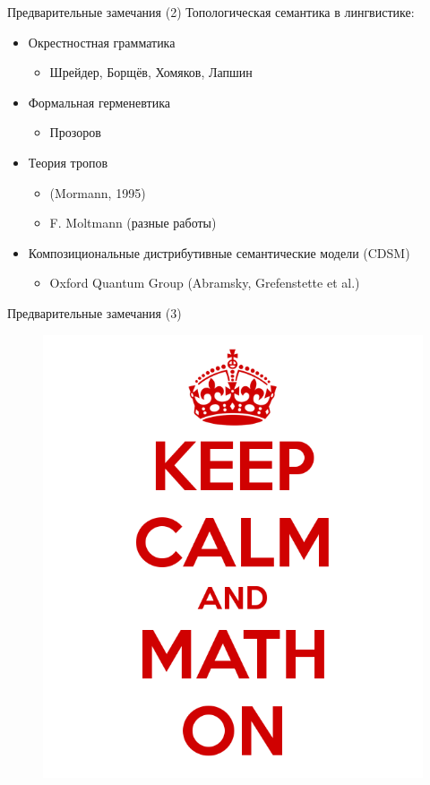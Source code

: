 \documentclass{beamer}
\begin{document}
\begin{frame}{Предварительные замечания (2)}
Топологическая семантика в лингвистике:\\
\bigskip
\begin{itemize}
    \item Окрестностная грамматика
		\begin{itemize}
			\item Шрейдер, Борщёв, Хомяков, Лапшин
		\end{itemize}
    \item Формальная герменевтика
		\begin{itemize}
			\item Прозоров
		\end{itemize}
    \item Теория тропов
		\begin{itemize}
			\item (Mormann, 1995)
			\item F. Moltmann (разные работы)
		\end{itemize}
    \item Композициональные дистрибутивные семантические модели (CDSM)
		\begin{itemize}
			\item Oxford Quantum Group (Abramsky, Grefenstette et al.)
		\end{itemize}
\end{itemize}
\end{frame}

\begin{frame}{Предварительные замечания (3)}
\begin{center}
	\begin{figure}[H]
		\includegraphics[scale=0.3]{keep_calm.png} 
	\end{figure}
\end{center}
\end{frame}
\end{document}
